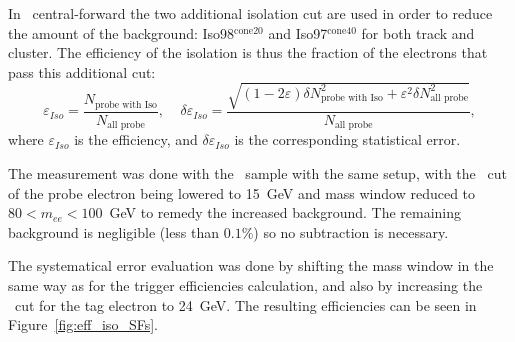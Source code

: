In \Zee\ central-forward the two additional isolation cut are used in order to reduce the amount of the background: Iso98\et$^{\mathrm{cone20}}$ and Iso97\pt$^{\mathrm{cone40}}$ for both track and cluster. The efficiency of the isolation is thus the fraction of the electrons that pass this additional cut:
\begin{equation}
\varepsilon_{Iso} = \frac{N_\text{probe with Iso} }{ N_\text{all probe} }, \;\;\;\;
\delta \varepsilon_{Iso} = \frac{\sqrt{(1-2\varepsilon) \delta N_\text{probe with Iso}^2 + \varepsilon^2 \delta N_\text{all probe}^2}}
                                {N_\text{all probe}},
\end{equation}
where $\varepsilon_{Iso}$ is the efficiency, and $\delta \varepsilon_{Iso}$ is the corresponding statistical error.

The measurement was done with the \Zee\ sample with the same setup, with the \pt\ cut of the probe electron being lowered to 15~GeV and mass window reduced to $80 < m_{ee} < 100$~GeV to remedy the increased background. The remaining background is negligible (less than $0.1$\%) so no subtraction is necessary.

The systematical error evaluation was done by shifting the mass window in the same way as for the trigger efficiencies calculation, and also by increasing the \pt\ cut for the tag electron to 24~GeV. The resulting efficiencies can be seen in Figure~\ref{fig:eff_iso_SFs}.

\begin{figure}
\end{figure}
